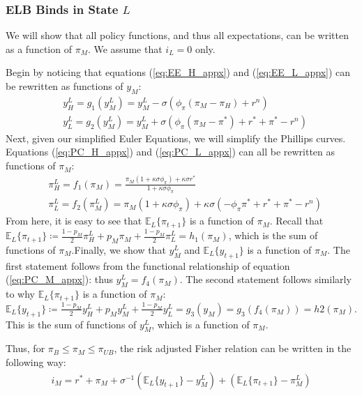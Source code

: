 \documentclass[11pt]{article}
\begin{document}
\begin{singlespace}
		\subsubsection{ELB Binds in State $L$}
		
		We will show that all policy functions, and thus all expectations, can be written as a function of $\pi_M$. We assume that $i_L = 0$ only.
		
		Begin by noticing that equations (\ref{eq:EE_H_appx}) and (\ref{eq:EE_L_appx}) can be rewritten as functions of $y_M$:
		\begin{align}
		& y^{L}_{H} = g_1(y^{L}_M) = y^{L}_M - \sigma\left(\phi_{\pi}(\pi_M - \pi_{H}) + r^n\right) \\
		& y^{L}_{L} = g_2(y^{L}_M)= y^{L}_M + \sigma\left(\phi_{\pi}(\pi_M - \pi^*) + r^* + \pi^* - r^n \right) 
		\end{align}
		Next, given our simplified Euler Equations, we will simplify the Phillips curves. Equations (\ref{eq:PC_H_appx}) and (\ref{eq:PC_L_appx}) can all be rewritten as functions of $\pi_M$:
		\begin{align}
		& \pi^{L}_{H} = f_1(\pi_M) =  \frac{\pi_M(1+ \kappa\sigma\phi_{\pi}) + \kappa\sigma r^*}{1+\kappa\sigma\phi_{\pi}}\\
		& \pi^{L}_{L} = f_2(\pi^{L}_M) = \pi_M(1+\kappa\sigma\phi_{\pi}) + \kappa\sigma(-\phi_{\pi}\pi^* + r^* + \pi^* - r^n)
		\end{align}
		From here, it is easy to see that $\mathbb{E}_{L}\{\pi_{t+1}\}$ is a function of $\pi_M$. Recall that $\mathbb{E}_{L}\{\pi_{t+1}\} \coloneqq \frac{1-p_M}{2}\pi^{L}_H + p_M\pi_M + \frac{1-p_M}{2}\pi^{L}_L = h_1(\pi_M)$, which is the sum of functions of $\pi_M$.Finally, we show that $y^{L}_M$ and $\mathbb{E}_{L}\{y_{t+1}\}$ is a function of $\pi_M$. The first statement follows from the functional relationship of equation (\ref{eq:PC_M_appx}): thus $y^{L}_M = f_4(\pi_M)$. The second statement follows similarly to why $\mathbb{E}_{L}\{\pi_{t+1}\}$ is a function of $\pi_M$: $\mathbb{E}_{L}\{y_{t+1}\} \coloneqq \frac{1-p_M}{2}y^{L}_H + p_My^{L}_M + \frac{1-p_M}{2}y^{L}_L = g_3(y_M) = g_3(f_4(\pi_M)) = h2(\pi_M)$. This is the sum of functions of $y^{L}_M$, which is a function of $\pi_M$.
		
		Thus, for $\pi_{B} \le \pi_M \le \pi_{UB}$, the risk adjusted Fisher relation can be written in the following way:
		\begin{align}
		i_M = r^* + \pi_M + \sigma^{-1}\left(\mathbb{E}_{L}\{y_{t+1}\} - y_M^{L}\right) + \left(\mathbb{E}_{L}\{\pi_{t+1}\} - \pi_M^{L}\right)
		\end{align}
		

\end{singlespace}
\end{document}
